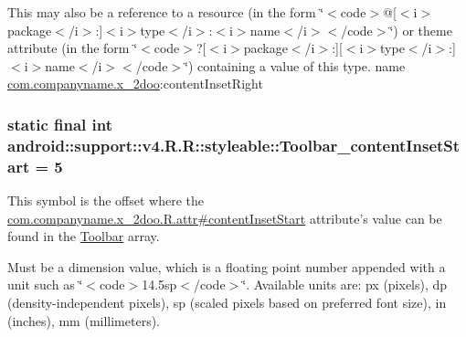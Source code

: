 This may also be a reference to a resource (in the form \char`\"{}$<$code$>$@\mbox{[}$<$i$>$package$<$/i$>$:\mbox{]}$<$i$>$type$<$/i$>$:$<$i$>$name$<$/i$>$$<$/code$>$\char`\"{}) or theme attribute (in the form \char`\"{}$<$code$>$?\mbox{[}$<$i$>$package$<$/i$>$:\mbox{]}\mbox{[}$<$i$>$type$<$/i$>$:\mbox{]}$<$i$>$name$<$/i$>$$<$/code$>$\char`\"{}) containing a value of this type.  name \hyperlink{namespacecom_1_1companyname_1_1x__2doo}{com.companyname.x\_\-2doo}:contentInsetRight \hypertarget{classandroid_1_1support_1_1v4_1_1_r_1_1styleable_829314820a2efd83c9b3b622103a1c68}{
\subsubsection[{Toolbar\_\-contentInsetStart}]{\setlength{\rightskip}{0pt plus 5cm}static final int android::support::v4.R.R::styleable::Toolbar\_\-contentInsetStart = 5}}
\label{classandroid_1_1support_1_1v4_1_1_r_1_1styleable_829314820a2efd83c9b3b622103a1c68}


This symbol is the offset where the \hyperlink{classcom_1_1companyname_1_1x__2doo_1_1_r_1_1attr_05ae6bcbd33b64b9f8c45fb31e7ed017}{com.companyname.x\_\-2doo.R.attr\#contentInsetStart} attribute's value can be found in the \hyperlink{classandroid_1_1support_1_1v4_1_1_r_1_1styleable_0646d71cfbd4a8645c7d805b33e1c574}{Toolbar} array.

Must be a dimension value, which is a floating point number appended with a unit such as \char`\"{}$<$code$>$14.5sp$<$/code$>$\char`\"{}. Available units are: px (pixels), dp (density-independent pixels), sp (scaled pixels based on preferred font size), in (inches), mm (millimeters). 

